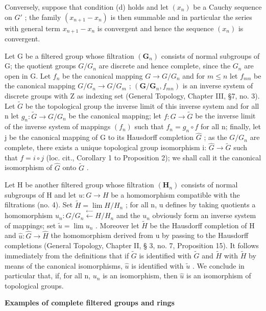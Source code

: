 Conversely, suppose that condition (d) holds and let \((x_{n})\) be a Cauchy sequence on \(G'\) ; the family \((x_{n+1} - x_{n})\) is then summable and in particular the series with general term \(x_{n+1} - x_{n}\) is convergent and hence the sequence \((x_{n})\) is convergent.

Let G be a filtered group whose filtration \((\mathbf{G}_{n})\) consists of normal subgroups of G; the quotient groups \(G/G_{n}\) are discrete and hence complete, since the \(G_{n}\) are open in G. Let \(f_{n}\) be the canonical mapping \(G \to G/G_{n}\) and for \(m \leqslant n\) let \(f_{mn}\) be the canonical mapping \(G/G_{n} \to G/G_{m}\) ; \((\mathbf{G}/\mathbf{G}_{n}, f_{mn})\) is an inverse system of discrete groups with Z as indexing set (General Topology, Chapter III, §7, no. 3). Let \(\tilde{G}\) be the topological group the inverse limit of this inverse system and for all n let \(g_{n}: \tilde{G} \to G/G_{n}\) be the canonical mapping; let \(f: G \to \tilde{G}\) be the inverse limit of the inverse system of mappings \((f_{n})\) such that \(f_{n} = g_{n} \circ f\) for all n; finally, let j be the canonical mapping of G to its Hausdorff completion \(\hat{G}\) ; as the \(G/G_{n}\) are complete, there exists a unique topological group isomorphism i: \(\hat{G} \to \tilde{G}\) such that \(f = i \circ j\) (loc. cit., Corollary 1 to Proposition 2); we shall call it the canonical isomorphism of \(\hat{G}\) onto \(\tilde{G}\) .

Let H be another filtered group whose filtration \((\mathbf{H}_{n})\) consists of normal subgroups of H and let \(u: G \to H\) be a homomorphism compatible with the filtrations (no. 4). Set \(\tilde{H} = \lim H/H_{n}\) ; for all n, u defines by taking quotients a homomorphism \(u_{n}: G/G_{n} \xleftarrow{\leftarrow} H/H_{n}\) and the \(u_{n}\) obviously form an inverse system of mappings; set \(\tilde{u} = \lim u_{n}\) . Moreover let \(\tilde{H}\) be the Hausdorff completion of H and \(\hat{u}: \hat{G} \to \hat{H}\) the homomorphism derived from u by passing to the Hausdorff completions (General Topology, Chapter II, § 3, no. 7, Proposition 15). It follows immediately from the definitions that if \(\tilde{G}\) is identified with \(\tilde{G}\) and \(\tilde{H}\) with \(\tilde{H}\) by means of the canonical isomorphisms, \(\hat{u}\) is identified with \(\tilde{u}\) . We conclude in particular that, if, for all n, \(u_{n}\) is an isomorphism, then \(\hat{u}\) is an isomorphism of topological groups.

\textbf{Examples of complete filtered groups and rings}\par

